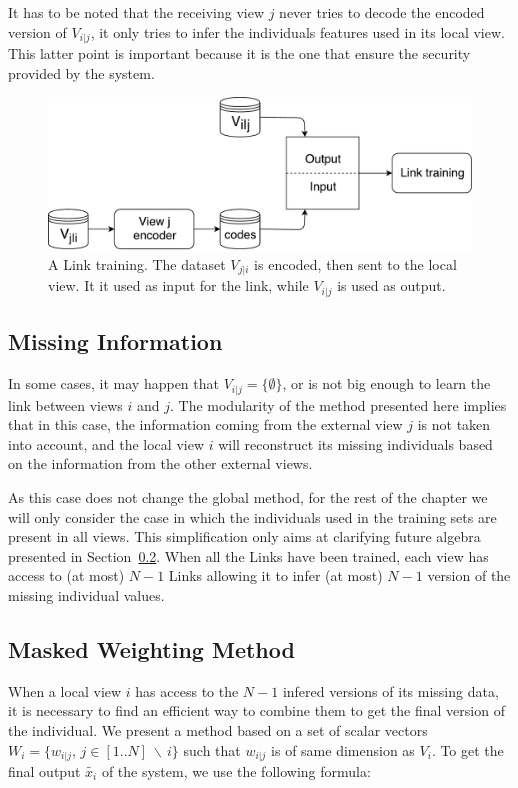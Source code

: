 It has to be noted that the receiving view $j$ never tries to decode the encoded version of $V_{i|j}$, it only tries to infer the individuals features used in its local view. This latter point is important because it is the one that ensure the security provided by the system.

		\begin{figure}[h]
			\centering
			\includegraphics[scale=0.4]{img/links.pdf}
            \caption{A Link training. The dataset $V_{j|i}$ is encoded, then sent to the local view. It it used as input for the link, while $V_{i|j}$ is used as output.}
\label{fig:link}
		\end{figure}
		
        \subsection{Missing Information}
In some cases, it may happen that $V_{i|j} = \{\emptyset\}$, or is not big enough to learn the link between views $i$ and $j$. The modularity of the method presented here implies that in this case, the information coming from the external view $j$ is not taken into account, and the local view $i$ will reconstruct its missing individuals based on the information from the other external views.
		
As this case does not change the global method, for the rest of the chapter we will only consider the case in which the individuals used in the training sets are present in all views. This simplification only aims at clarifying future algebra presented in Section~\ref{sec:mwm}. When all the Links have been trained, each view has access to (at most) $N-1$ Links allowing it to infer (at most) $N-1$ version of the missing individual values.
		
		\subsection{Masked Weighting Method}
\label{sec:mwm}
When a local view $i$ has access to the $N-1$ infered versions of its missing data, it is necessary to find an efficient way to combine them to get the final version of the individual. We present a method based on a set of scalar vectors $W_i = \{w_{i|j}, \, j \in [1..N]\, \backslash \, i\}$ such that $w_{i|j}$ is of same dimension as $V_i$. To get the final output $\widetilde{x_i}$ of the system, we use the following formula:
		
